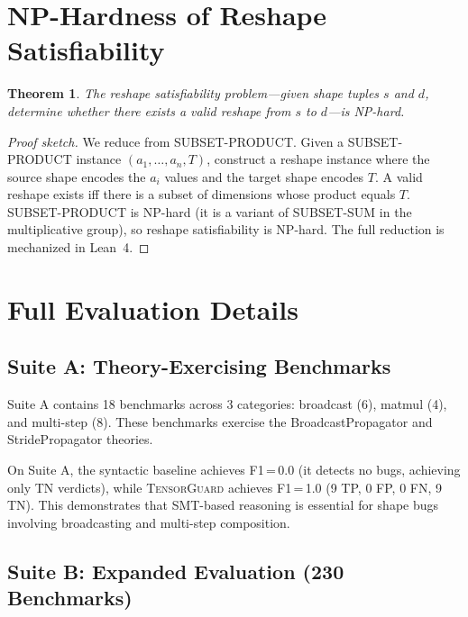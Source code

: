 \documentclass[11pt]{article}
\newtheorem{theorem}{Theorem}
\begin{document}
\section{NP-Hardness of Reshape Satisfiability}\label{app:reshape-hardness}

\begin{theorem}
The reshape satisfiability problem---given shape tuples $s$ and $d$,
determine whether there exists a valid reshape from $s$ to $d$---is
NP-hard.
\end{theorem}

\begin{proof}[Proof sketch]
We reduce from SUBSET-PRODUCT.  Given a SUBSET-PRODUCT instance
$(a_1, \ldots, a_n, T)$, construct a reshape instance where the
source shape encodes the $a_i$ values and the target shape encodes
$T$.  A valid reshape exists iff there is a subset of dimensions
whose product equals $T$.  SUBSET-PRODUCT is NP-hard (it is a
variant of SUBSET-SUM in the multiplicative group), so reshape
satisfiability is NP-hard.  The full reduction is mechanized in
Lean~4.
\end{proof}


\section{Full Evaluation Details}\label{app:eval-details}

\subsection{Suite A: Theory-Exercising Benchmarks}\label{sec:suite-a}

Suite A contains 18 benchmarks across 3 categories: broadcast (6),
matmul (4), and multi-step (8).  These benchmarks exercise the
BroadcastPropagator and StridePropagator theories.

On Suite A, the syntactic baseline achieves F1\,=\,0.0 (it detects
no bugs, achieving only TN verdicts), while \textsc{TensorGuard}
achieves F1\,=\,1.0 (9 TP, 0 FP, 0 FN, 9 TN).  This
demonstrates that SMT-based reasoning is essential for shape bugs
involving broadcasting and multi-step composition.

\subsection{Suite B: Expanded Evaluation (230 Benchmarks)}
\end{document}
